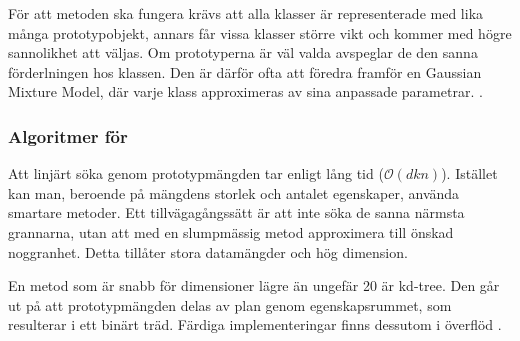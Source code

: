 \documentclass[../rapport_MVEX01-11-05]{subfiles}
\begin{document}
För att metoden ska fungera krävs att alla klasser är representerade med lika
många prototypobjekt, annars får vissa klasser större vikt och kommer med högre
sannolikhet att väljas. Om prototyperna är väl valda avspeglar de den sanna
förderlningen hos klassen.
Den är därför ofta att föredra framför en Gaussian Mixture Model, där
varje klass approximeras av sina anpassade parametrar.
\cite{Hastie09}.

\subsubsection{Algoritmer för \knn}
Att linjärt söka genom prototypmängden tar enligt
 lång tid ($\mathcal{O}(d k n)$).
Istället kan man, beroende på mängdens storlek och antalet egenskaper,
använda smartare metoder.
Ett tillvägagångssätt är att inte söka de sanna närmsta grannarna,
utan att med en slumpmässig metod approximera till önskad noggranhet.
Detta tillåter stora datamängder och hög dimension.

En metod som är snabb för dimensioner lägre än ungefär 20 är kd-tree.
Den går ut på att prototypmängden delas av plan genom egenskapsrummet,
som resulterar i ett binärt träd. Färdiga implementeringar finns dessutom
i överflöd \cite{Skiena08}.

%

\end{document}
